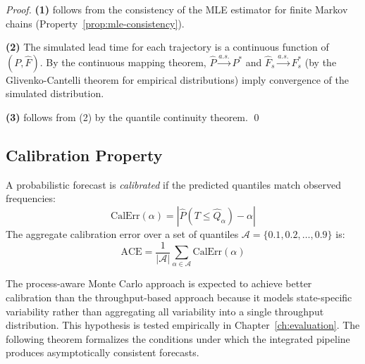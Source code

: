 \begin{proof}
\textbf{(1)} follows from the consistency of the MLE estimator for 
finite Markov chains (Property~\ref{prop:mle-consistency}).

\textbf{(2)} The simulated lead time for each trajectory is a 
continuous function of $(P, \hat{F})$. By the continuous mapping 
theorem, $\hat{P} \xrightarrow{a.s.} P^*$ and 
$\hat{F}_s \xrightarrow{a.s.} F_s^*$ (by the Glivenko-Cantelli 
theorem for empirical distributions) imply convergence of the 
simulated distribution.

\textbf{(3)} follows from (2) by the quantile continuity 
theorem. \qed
\end{proof}


\subsection{Calibration Property}
\label{sec:prop-calibration}

\begin{definition}
\label{def:calibration}
A probabilistic forecast is \emph{calibrated} if the predicted quantiles
match observed frequencies:
\begin{equation}
\label{eq:calibration}
\text{CalErr}(\alpha) = \left| \hat{P}(T \leq \hat{Q}_\alpha) - \alpha \right|
\end{equation}
The aggregate calibration error over a set of quantiles
$\mathcal{A} = \{0.1, 0.2, \ldots, 0.9\}$ is:
\begin{equation}
\label{eq:aggregate-calibration}
\text{ACE} = \frac{1}{|\mathcal{A}|} \sum_{\alpha \in \mathcal{A}} \text{CalErr}(\alpha)
\end{equation}
\end{definition}

The process-aware Monte Carlo approach is expected to achieve better
calibration than the throughput-based approach because it models
state-specific variability rather than aggregating all variability into
a single throughput distribution. This hypothesis is tested empirically
in Chapter~\ref{ch:evaluation}. The following theorem formalizes the
conditions under which the integrated pipeline produces asymptotically
consistent forecasts.

